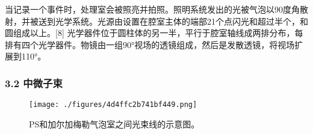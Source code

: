 当记录一个事件时，处理室会被照亮并拍照。照明系统发出的光被气泡以90度角散射，并被送到光学系统。光源由设置在腔室主体的端部21个点闪光和超过半个，和圆组成以上。[8] 光学器件位于圆柱体的另一半，平行于腔室轴线成两排分布，每排有四个光学器件。物镜由一组90°视场的透镜组成，然后是发散透镜，将视场扩展到110°。
\subsubsection{3.2 中微子束}
\begin{figure}[ht]
\centering
\texttt{[image: ./figures/4d4ffc2b741bf449.png]}
\caption{PS和加尔加梅勒气泡室之间光束线的示意图。} \label{fig_JRJML_4}
\end{figure}